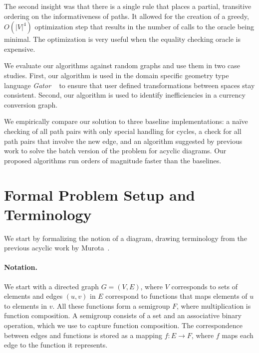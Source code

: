 \documentclass[sigplan,review,anonymous]{acmart}
\begin{document}
The second insight was that there is a single rule that places a partial, transitive ordering on the informativeness of paths.
It allowed for the creation of a greedy, $O(|V|^4)$ optimization step that results in the number of calls to the oracle being minimal.
The optimization is very useful when the equality checking oracle is expensive.

We evaluate our algorithms against random graphs and use them in two case studies.
First, our algorithm is used in the domain specific geometry type language \textit{Gator} ~\cite{gator} to ensure that user defined transformations between spaces stay consistent.
Second, our algorithm is used to identify inefficiencies in a currency conversion graph.

We empirically compare our solution to three baseline implementations: a na\"{i}ve checking of all path pairs with only special handling for cycles, a check for all path pairs that involve the new edge, and an algorithm suggested by previous work to solve the batch version of the problem for acyclic diagrams.
Our proposed algorithms run orders of magnitude faster than the baselines.

\section{Formal Problem Setup and Terminology}

We start by formalizing the notion of a diagram, drawing terminology from the previous acyclic work by Murota~\cite{commutative}.

\paragraph{Notation.}

We start with a directed graph $G=(V,E)$, where $V$ corresponds to sets of elements and edges $(u, v)$ in $E$ correspond to functions that maps elements of $u$ to elements in $v$.
All these functions form a semigroup $F$, where multiplication is function composition.
A semigroup consists of a set and an associative binary operation, which we use to capture function composition.
%
The correspondence between edges and functions is stored as a mapping $f:E\rightarrow F$, where $f$ maps each edge to the function it represents.
\end{document}

